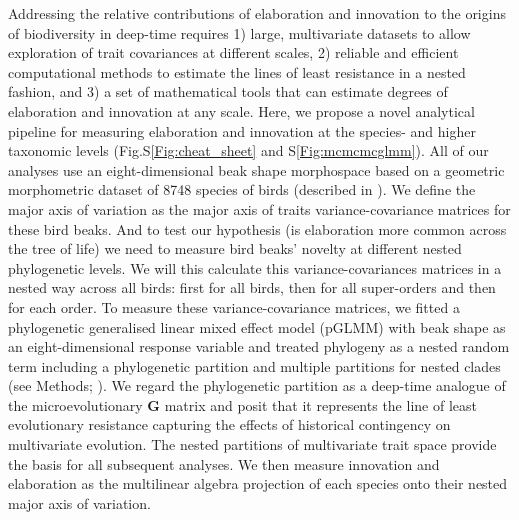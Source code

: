 \documentclass[12pt,letterpaper]{article}
\begin{document}
Addressing the relative contributions of elaboration and innovation to the origins of biodiversity in deep-time requires
1) large, multivariate datasets to allow exploration of trait covariances at different scales,
2) reliable and efficient computational methods to estimate the lines of least resistance in a nested fashion,
and 3) a set of mathematical tools that can estimate degrees of elaboration and innovation at any scale.
Here, we propose a novel analytical pipeline for measuring elaboration and innovation at the species- and higher taxonomic levels (Fig.S\ref{Fig:cheat_sheet} and S\ref{Fig:mcmcmcglmm}).
All of our analyses use an eight-dimensional beak shape morphospace based on a geometric morphometric dataset of 8748 species of birds (described in \cite{hughes2022global}).
We define the major axis of variation as the major axis of traits variance-covariance matrices for these bird beaks.
And to test our hypothesis (is elaboration more common across the tree of life) we need to  measure bird beaks' novelty at different nested phylogenetic levels.
We will this calculate this variance-covariances matrices in a nested way across all birds: first for all birds, then for all super-orders and then for each order.
To measure these variance-covariance matrices, we fitted a phylogenetic generalised linear mixed effect model (pGLMM) with beak shape as an eight-dimensional response variable and treated phylogeny as a nested random term including a phylogenetic partition and multiple partitions for nested clades (see Methods; \cite{MCMCglmm}).
We regard the phylogenetic partition as a deep-time analogue of the microevolutionary \textbf{G} matrix and posit that it represents the line of least evolutionary resistance capturing the effects of historical contingency on multivariate evolution.
The nested partitions of multivariate trait space provide the basis for all subsequent analyses.
We then measure innovation and elaboration as the multilinear algebra projection of each species onto their nested major axis of variation.
\end{document}
